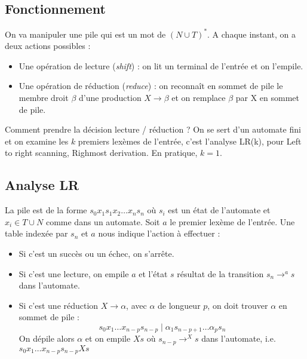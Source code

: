 \documentclass{cours}
\begin{document}
\subsection{Fonctionnement}
On va manipuler une pile qui est un mot de $(N \cup T)^{*}$. 
A chaque instant, on a deux actions possibles : 
\begin{itemize}
    \item Une opération de lecture (\textit{shift}) : on lit un terminal de l'entrée et on l'empile.
    \item Une opération de réduction (\textit{reduce}) : on reconnaît en sommet de pile le membre droit $\beta$ d'une production $X \rightarrow \beta$ et on remplace $\beta$ par X en sommet de pile.
\end{itemize}
Comment prendre la décision lecture / réduction ? On se sert d'un automate fini et on examine les $k$ premiers lexèmes de l'entrée, c'est l'analyse \textmd{LR(k)}, pour \og Left to right scanning, Righmost derivation\fg. En pratique, $k = 1$.
\subsection{Analyse LR}
La pile est de la forme $s_{0}x_{1}s_{1}x_{2}\ldots x_{n}s_{n}$ où $s_{i}$ est un état de l'automate et $x_{i} \in T \cup N$ comme dans un automate. 
Soit $a$ le premier lexème de l'entrée. Une table indexée par $s_{n}$ et $a$ nous indique l'action à effectuer : 
\begin{itemize}
    \item Si c'est un succès ou un échec, on s'arrête.
    \item Si c'est une lecture, on empile $a$ et l'état $s$ résultat de la transition $s_{n} \rightarrow^{a} s$ dans l'automate.
    \item Si c'est une réduction $X \rightarrow \alpha$, avec $\alpha$ de longueur $p$, on doit trouver $\alpha$ en sommet de pile : 
    \[
        s_{0}x_{1}\ldots x_{n-p}s_{n-p}\mid \alpha_{1}s_{n-p+1}\ldots \alpha_{p}s_{n}
    \]
    On dépile alors $\alpha$ et on empile $X s$ où $s_{n-p} \rightarrow^{X} s$ dans l'automate, i.e. $s_{0}x_{1}\ldots x_{n-p}s_{n-p}Xs$
\end{itemize}
\end{document}
